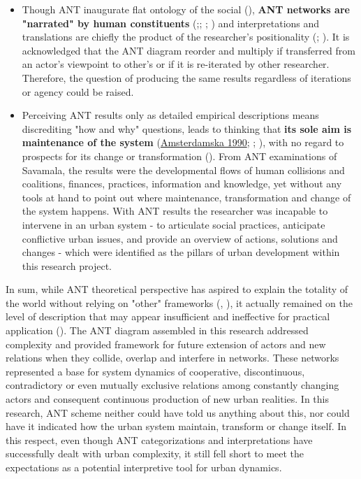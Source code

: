 \documentclass[11pt]{report}
\begin{document}
{\begin{itemize}
\item Though ANT inaugurate flat ontology of the social (\href{ref}{\citealt{latour_reassembling_2005}}), \textbf{ANT networks are "narrated" by human constituents} (\href{ref}{\citealt{pickering_epistemological_1992}};\href{ref}{\citealt{czarniawska_narrating_1997}}; \href{ref}{\citealt{whittle_is_2008}};  \href{ref}{\citealt{marshall_mapping_2015}}) and interpretations and translations are chiefly the product of the researcher's positionality  (\href{ref}{\citealt{rose_situating_1997}}; \href{ref}{\citealt{ruming_following_2009}}). It is acknowledged that the ANT diagram reorder and multiply if transferred from an actor’s viewpoint to other’s or if it is re-iterated by other researcher. Therefore, the question of producing the same results regardless of iterations or agency could be raised.

\item Perceiving ANT results only as detailed empirical descriptions means discrediting "how and why" questions, leads to thinking that \textbf{its sole aim is maintenance of the system} (\href{ref}{Amsterdamska 1990}; \cite{Lee and Brown 1994}; \href{ref}{\citealt{lee_otherness_1994}}), with no regard to prospects for its change or transformation (\href{ref}{\citealt{gabriel_post-social_2008}}).
From ANT examinations of Savamala, the results were the developmental flows of human collisions and coalitions, finances, practices, information and knowledge, yet without any tools at hand to point out where maintenance, transformation and change of the system happens.
With ANT results the researcher was incapable to intervene in an urban system - to articulate social practices, anticipate conflictive urban issues, and provide an overview of actions, solutions and changes - which were identified as the pillars of urban development within this research project.
\end{itemize}
 
In sum, while ANT theoretical perspective has aspired to explain the totality of the world without relying on "other" frameworks (\href{ref}{\citealt{lee_otherness_1994}},  \href{ref}{\citealt{gad_consequences_2010}}), it actually remained on the level of description that may appear insufficient and ineffective for practical application (\href{ref}{\citealt{gabriel_post-social_2008}}).
The ANT diagram assembled in this research addressed complexity and provided framework for future extension of actors and new relations when they collide, overlap and interfere in networks.
These networks represented a base for system dynamics of cooperative, discontinuous, contradictory or even mutually exclusive relations among constantly changing actors and consequent continuous production of new urban realities.
In this research, ANT scheme neither could have told us anything about this, nor could have it indicated how the urban system maintain, transform or change itself. In this respect, even though ANT categorizations and interpretations have successfully dealt with urban complexity, it still fell short to meet the expectations as a potential interpretive tool for urban dynamics.
\\

}
\end{document}
